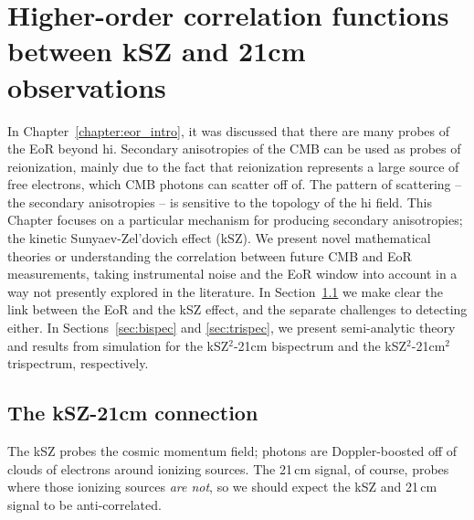 \chapter{Higher-order correlation functions between kSZ and 21cm observations}
\label{chapter:ksz_21cm}

In Chapter~\ref{chapter:eor_intro}, it was discussed that there are many probes of the EoR beyond {\sc hi}. Secondary anisotropies of the CMB can be used as probes of reionization, mainly due to the fact that reionization represents a large source of free electrons, which CMB photons can scatter off of. The pattern of scattering -- the secondary anisotropies -- is sensitive to the topology of the {\sc hi} field. This Chapter focuses on a particular mechanism for producing secondary anisotropies; the kinetic Sunyaev-Zel'dovich effect (kSZ). We present novel mathematical theories or understanding the correlation between future CMB and EoR measurements, taking instrumental noise and the EoR window into account in a way not presently explored in the literature. In Section~\ref{sec:ksz-21cm} we make clear the link between the EoR and the kSZ effect, and the separate challenges to detecting either. In Sections~\ref{sec:bispec} and \ref{sec:trispec}, we present semi-analytic theory and results from simulation for the kSZ$^2$-21cm bispectrum and the kSZ$^2$-21cm$^2$ trispectrum, respectively.

\section{The kSZ-21cm connection}
\label{sec:ksz-21cm}

The kSZ probes the cosmic momentum field; photons are Doppler-boosted off of clouds of electrons around ionizing sources. The 21\,cm signal, of course, probes where those ionizing sources \textit{are not}, so we should expect the kSZ and 21\,cm signal to be anti-correlated. 

